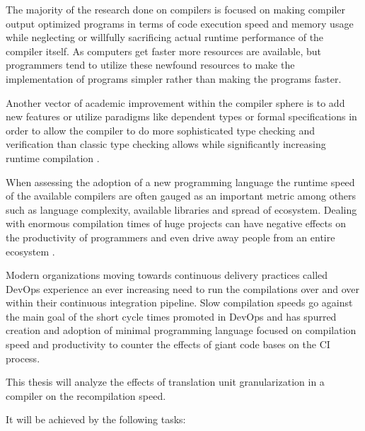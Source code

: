 \documentclass{VUMIFPSbakalaurinis}
\begin{document}


The majority of the research done on compilers is focused on making compiler output optimized programs in terms of code execution speed and memory usage \cite{lopes2018future} while neglecting or willfully sacrificing \cite{fast2019compilers} actual runtime performance of the compiler itself.
As computers get faster more resources are available, but programmers tend to utilize these newfound resources to make the implementation of programs simpler rather than making the programs faster\cite{Wirth1995}.

Another vector of academic improvement within the compiler sphere is to add new features or utilize paradigms like dependent types or formal specifications\cite{RustVerification} in order to allow the compiler to do more sophisticated type checking and verification than classic type checking allows while significantly increasing runtime compilation .

When assessing the adoption of a new programming language the runtime speed of the available compilers are often gauged as an important metric\cite{ScalaSlow} among others such as language complexity, available libraries and spread of ecosystem.
Dealing with enormous compilation times of huge projects can have negative effects on the productivity of programmers and even drive away people from an entire ecosystem \cite{ScalaReallySlow, ScalaSlow}.

Modern organizations moving towards continuous delivery practices called DevOps \cite{DevOps} experience an ever increasing need to run the compilations over and over within their continuous integration pipeline.
Slow compilation speeds go against the main goal of the short cycle times promoted in DevOps and has spurred creation and adoption of minimal programming language focused on compilation speed and productivity to counter the effects of giant code bases on the CI process\cite{TheGoProgrammingLanguage, GoGoogle}.

This thesis will analyze the effects of translation unit granularization in a compiler on the recompilation speed.

It will be achieved by the following tasks:
\end{document}
